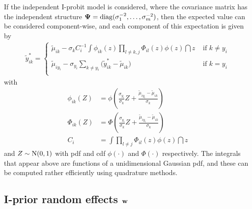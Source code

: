 If the independent I-probit model is considered, where the covariance matrix has the independent structure ${\bm\Psi} = \operatorname{diag}(\sigma_1^{-2},\dots,\sigma_m^{-2})$, then the expected value can be considered component-wise, and each component of this expectation is given by
\begin{align}\label{eq:ystarupdate}
  \tilde y_{ik}^* =
  \begin{cases}
    \tilde\mu_{ik} - \sigma_k C_i^{-1} \displaystyle{  \int \phi_{ik}(z) \prod_{l \neq k,j} \Phi_{il}(z) \phi(z) \dint z }
    &\text{ if } k \neq y_i \\[1.5em]
    \tilde\mu_{iy_i} - \sigma_{y_i} \sum_{k \neq y_i} \big(\tilde y_{ik}^* - \tilde \mu_{ik} \big) 
    &\text{ if } k = y_i \\
  \end{cases}
\end{align}
with 
\begin{align*}
  \phi_{ik}(Z) &= \phi \left(\frac{\sigma_{y_i}}{\sigma_k} Z + \frac{\tilde\mu_{iy_i} - \tilde\mu_{ik}}{\sigma_k} \right) \\
  \Phi_{ik}(Z) &= \Phi \left(\frac{\sigma_{y_i}}{\sigma_k} Z + \frac{\tilde\mu_{iy_i} - \tilde\mu_{ik}}{\sigma_k} \right) \\
  C_i &= \int \prod_{l \neq j} \Phi_{il}(z) \phi(z) \dint z
\end{align*}
and $Z \sim \operatorname{N}(0,1)$ with pdf and cdf $\phi(\cdot)$ and $\Phi(\cdot)$ respectively. 
The integrals that appear above are functions of a unidimensional Gaussian pdf, and these can be computed rather efficiently using quadrature methods.

\subsection{I-prior random effects \texorpdfstring{${\mathbf w}$}{$w$}}


